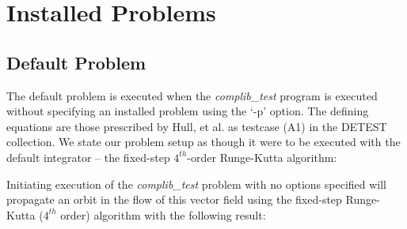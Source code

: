 
\section{Installed Problems}

\subsection{Default Problem}

\noindent The default problem is executed when the {\em complib\_test} program
is executed without specifying an installed problem using the `-p' option.  The
defining equations are those prescribed by Hull, et al. \cite{hull1} as testcase (A1)
in  the DETEST collection.  We state our problem setup as though it were to be executed
with the default integrator -- the fixed-step $4^{th}$-order Runge-Kutta algorithm:

\medskip
\begin{center}
\end{center}
\medskip

\noindent Initiating execution of the {\em complib\_test} problem with no options specified
will propagate an orbit in the flow of this vector field using the fixed-step Runge-Kutta
($4^{th}$ order) algorithm with the following result:

